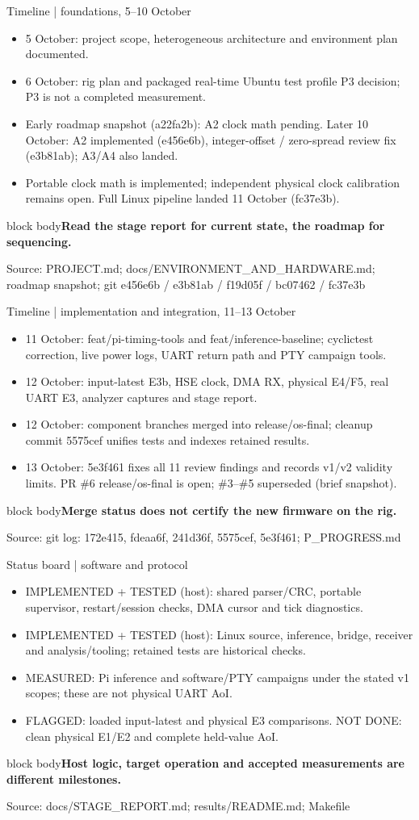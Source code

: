 \documentclass[aspectratio=169,12pt,t]{beamer}
\newcommand{\src}[1]{\par\vfill{\small\color{muted}Source: #1}}
\newcommand{\takeaway}[1]{\par\medskip\begin{beamercolorbox}[sep=2mm,wd=\linewidth]{block body}\color{navy}\textbf{#1}\end{beamercolorbox}}
\begin{document}
\begin{frame}{Timeline | foundations, 5–10 October}
\begin{itemize}
\item 5 October: project scope, heterogeneous architecture and environment plan documented.
\item 6 October: rig plan and packaged real-time Ubuntu test profile P3 decision; P3 is not a completed measurement.
\item Early roadmap snapshot (a22fa2b): A2 clock math pending. Later 10 October: A2 implemented (e456e6b), integer-offset / zero-spread review fix (e3b81ab); A3/A4 also landed.
\item Portable clock math is implemented; independent physical clock calibration remains open. Full Linux pipeline landed 11 October (fc37e3b).
\end{itemize}
\takeaway{Read the stage report for current state, the roadmap for sequencing.}\src{PROJECT.md; docs/ENVIRONMENT\_AND\_HARDWARE.md; roadmap snapshot; git e456e6b / e3b81ab / f19d05f / bc07462 / fc37e3b}
\end{frame}
\begin{frame}{Timeline | implementation and integration, 11–13 October}
\begin{itemize}
\item 11 October: feat/pi-timing-tools and feat/inference-baseline; cyclictest correction, live power logs, UART return path and PTY campaign tools.
\item 12 October: input-latest E3b, HSE clock, DMA RX, physical E4/F5, real UART E3, analyzer captures and stage report.
\item 12 October: component branches merged into release/os-final; cleanup commit 5575cef unifies tests and indexes retained results.
\item 13 October: 5e3f461 fixes all 11 review findings and records v1/v2 validity limits. PR \#6 release/os-final is open; \#3–\#5 superseded (brief snapshot).
\end{itemize}
\takeaway{Merge status does not certify the new firmware on the rig.}\src{git log: 172e415, fdeaa6f, 241d36f, 5575cef, 5e3f461; P\_PROGRESS.md}
\end{frame}
\begin{frame}{Status board | software and protocol}
\begin{itemize}
\item IMPLEMENTED + TESTED (host): shared parser/CRC, portable supervisor, restart/session checks, DMA cursor and tick diagnostics.
\item IMPLEMENTED + TESTED (host): Linux source, inference, bridge, receiver and analysis/tooling; retained tests are historical checks.
\item MEASURED: Pi inference and software/PTY campaigns under the stated v1 scopes; these are not physical UART AoI.
\item FLAGGED: loaded input-latest and physical E3 comparisons. NOT DONE: clean physical E1/E2 and complete held-value AoI.
\end{itemize}
\takeaway{Host logic, target operation and accepted measurements are different milestones.}\src{docs/STAGE\_REPORT.md; results/README.md; Makefile}
\end{frame}
\end{document}
